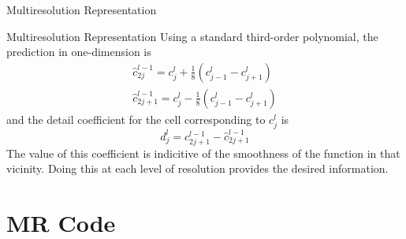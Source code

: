 \documentclass{beamer}
\begin{document}
\begin{frame}[shrink=10]{Multiresolution Representation}
\begin{figure}
	\end{figure}

\end{frame}


\begin{frame}[shrink=10]{Multiresolution Representation}
	Using a standard third-order polynomial, the prediction in one-dimension is
	\begin{align*}
		\hat{c}^{l-1}_{2j} = c^{l}_{j} + \frac{1}{8} \left( c^{l}_{j-1} - c^{l}_{j+1} \right) \\
		\hat{c}^{l-1}_{2j+1} = c^{l}_{j} - \frac{1}{8} \left( c^{l}_{j-1} - c^{l}_{j+1} \right)
	\end{align*}
	and the detail coefficient for the cell corresponding to $c^{l}_{j}$ is
	\begin{equation*}
		d^{l}_{j} = c_{2j+1}^{l-1} - \hat{c}_{2j+1}^{l-1}
	\end{equation*}
	The value of this coefficient is indicitive of the smoothness of the function in that vicinity. Doing this at
	each level of resolution provides the desired information.

\end{frame}


\section{MR Code}
\end{document}
